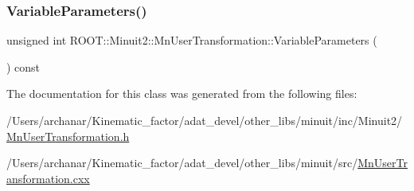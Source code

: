 \subsubsection{\texorpdfstring{VariableParameters()}{VariableParameters()}\hspace{0.1cm}{\footnotesize\ttfamily [2/2]}}
{\footnotesize\ttfamily unsigned int R\+O\+O\+T\+::\+Minuit2\+::\+Mn\+User\+Transformation\+::\+Variable\+Parameters (\begin{DoxyParamCaption}{ }\end{DoxyParamCaption}) const\hspace{0.3cm}{\ttfamily [inline]}}



The documentation for this class was generated from the following files\+:\begin{DoxyCompactItemize}
\item 
/\+Users/archanar/\+Kinematic\+\_\+factor/adat\+\_\+devel/other\+\_\+libs/minuit/inc/\+Minuit2/\mbox{\hyperlink{other__libs_2minuit_2inc_2Minuit2_2MnUserTransformation_8h}{Mn\+User\+Transformation.\+h}}\item 
/\+Users/archanar/\+Kinematic\+\_\+factor/adat\+\_\+devel/other\+\_\+libs/minuit/src/\mbox{\hyperlink{MnUserTransformation_8cxx}{Mn\+User\+Transformation.\+cxx}}\end{DoxyCompactItemize}
